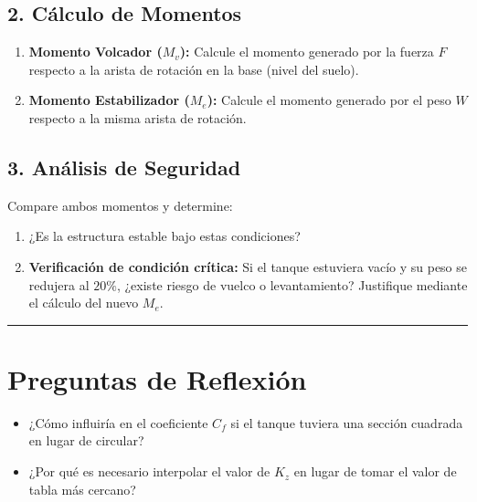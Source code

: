 \documentclass[11pt,a4paper]{article}
\newcommand{\linea}{\vspace{0.5cm} \hrule \vspace{0.5cm}}
\begin{document}
\subsection*{2. Cálculo de Momentos}
\begin{enumerate}
    \item \textbf{Momento Volcador ($M_v$):} Calcule el momento generado por la fuerza $F$ respecto a la arista de rotación en la base (nivel del suelo).
    \item \textbf{Momento Estabilizador ($M_e$):} Calcule el momento generado por el peso $W$ respecto a la misma arista de rotación.
\end{enumerate}

\subsection*{3. Análisis de Seguridad}
Compare ambos momentos y determine:
\begin{enumerate}
    \item ¿Es la estructura estable bajo estas condiciones?
    \item \textbf{Verificación de condición crítica:} Si el tanque estuviera vacío y su peso se redujera al $20\%$, ¿existe riesgo de vuelco o levantamiento? Justifique mediante el cálculo del nuevo $M_e$.
\end{enumerate}

\linea

\section*{Preguntas de Reflexión}
\begin{itemize}
    \item ¿Cómo influiría en el coeficiente $C_f$ si el tanque tuviera una sección cuadrada en lugar de circular?
    \item ¿Por qué es necesario interpolar el valor de $K_z$ en lugar de tomar el valor de tabla más cercano?
\end{itemize}
\end{document}
